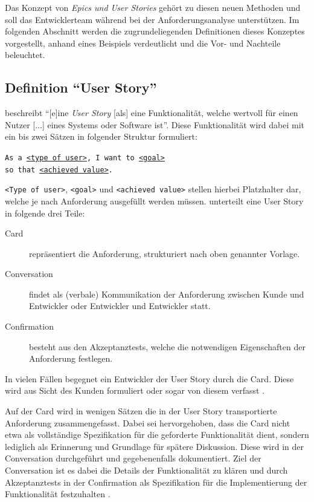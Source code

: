 \documentclass[acmtog]{acmart}
\begin{document}
Das Konzept von \emph{Epics und User Stories} gehört zu diesen neuen Methoden und soll das Entwicklerteam
während bei der Anforderungsanalyse unterstützen. Im folgenden Abschnitt werden die zugrundeliegenden Definitionen
dieses Konzeptes vorgestellt, anhand eines Beispiels verdeutlicht und die Vor- und Nachteile beleuchtet.

\subsection{Definition ``User Story''}
\cite[p. 4]{cohn_user_2004} beschreibt ``[e]ine \emph{User Story} [als] eine Funktionalität, welche wertvoll für einen Nutzer [...] eines Systems
oder Software ist''.
Diese Funktionalität wird dabei mit ein bis zwei Sätzen in folgender Struktur formuliert:

\vspace{1em}
\texttt{As a \underline{<type of user>}, I want to \underline{<goal>}\\
	\hspace*{13em} so that \underline{<achieved value>}.}
\begin{flushright}
	\cite[p. 499]{balzert09}
\end{flushright}


\vspace{.5em}

\verb|<Type of user>|, \verb|<goal>| und \verb|<achieved value>| stellen hierbei Platzhalter dar,
welche je nach Anforderung ausgefüllt werden müssen.
\cite{jeffries_essential_2001} unterteilt eine User Story in folgende drei Teile:
\begin{description}
	\item[Card] repräsentiert die Anforderung, strukturiert nach oben genannter Vorlage.
	\item[Conversation] findet als (verbale) Kommunikation der Anforderung zwischen Kunde und Entwickler oder Entwickler und Entwickler statt.
	\item[Confirmation] besteht aus den Akzeptanztests, welche die notwendigen Eigenschaften der Anforderung festlegen.
\end{description}

In vielen Fällen begegnet ein Entwickler der User Story durch die Card.
Diese wird aus Sicht des Kunden formuliert oder sogar von diesem verfasst \cite[p. 497]{balzert09}.

Auf der Card wird in wenigen Sätzen die in der User Story transportierte Anforderung zusammengefasst.
Dabei sei hervorgehoben, dass die Card nicht etwa als vollständige Spezifikation für die geforderte Funktionalität dient,
sondern lediglich als Erinnerung und Grundlage für spätere Diskussion.
Diese wird in der Conversation durchgeführt und gegebenenfalls dokumentiert.
Ziel der Conversation ist es dabei die Details der Funktionalität zu klären
und durch Akzeptanztests in der Confirmation als Spezifikation für die Implementierung
der Funktionalität festzuhalten \cite[p. 4]{cohn_user_2004}.
\end{document}
